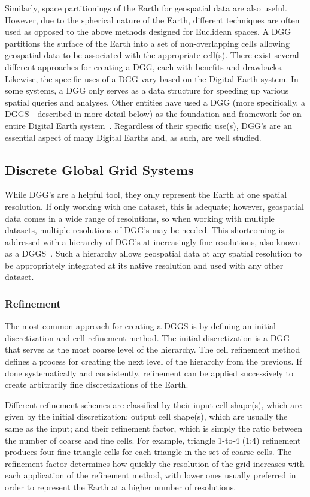 Similarly, space partitionings of the Earth for geospatial data are also useful.
However, due to the spherical nature of the Earth, different techniques are often used as opposed to the above methods designed for Euclidean spaces.
A DGG partitions the surface of the Earth into a set of non-overlapping cells allowing geospatial data to be associated with the appropriate cell(s).
There exist several different approaches for creating a DGG, each with benefits and drawbacks.
Likewise, the specific uses of a DGG vary based on the Digital Earth system.
In some systems, a DGG only serves as a data structure for speeding up various spatial queries and analyses.
Other entities have used a DGG (more specifically, a DGGS---described in more detail below) as the foundation and framework for an entire Digital Earth system~\cite{peterson2011close}.
Regardless of their specific use(s), DGG's are an essential aspect of many Digital Earths and, as such, are well studied.


\subsection{Discrete Global Grid Systems}
While DGG's are a helpful tool, they only represent the Earth at one spatial resolution.
If only working with one dataset, this is adequate; however, geospatial data comes in a wide range of resolutions, so when working with multiple datasets, multiple resolutions of DGG's may be needed.
This shortcoming is addressed with a hierarchy of DGG's at increasingly fine resolutions, also known as a DGGS~\cite{sahr1998discrete, sahr2003geodesic}.
Such a hierarchy allows geospatial data at any spatial resolution to be appropriately integrated at its native resolution and used with any other dataset.


\subsubsection{Refinement}
The most common approach for creating a DGGS is by defining an initial discretization and cell refinement method.
The initial discretization is a DGG that serves as the most coarse level of the hierarchy. The cell refinement method defines a process for creating the next level of the hierarchy from the previous.
If done systematically and consistently, refinement can be applied successively to create arbitrarily fine discretizations of the Earth.


Different refinement schemes are classified by their input cell shape(s), which are given by the initial discretization; output cell shape(s), which are usually the same as the input; and their refinement factor, which is simply the ratio between the number of coarse and fine cells.
For example, triangle 1-to-4 (1:4) refinement produces four fine triangle cells for each triangle in the set of coarse cells.
The refinement factor determines how quickly the resolution of the grid increases with each application of the refinement method, with lower ones usually preferred in order to represent the Earth at a higher number of resolutions.



